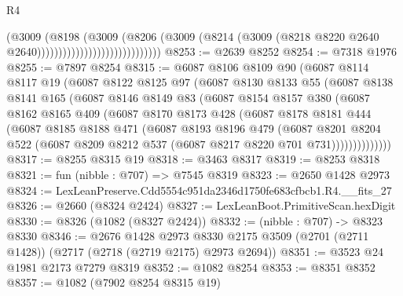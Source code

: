 \begin{lexlean}{R4}
\begin{coremodule}
                                              (@3009
                                                (@8198
                                                  (@3009
                                                    (@8206
                                                      (@3009
                                                        (@8214
                                                          (@3009
                                                            (@8218
                                                              @8220
                                                              @2640
                                                              @2640)))))))))))))))))))))))))))))
@8253 := @2639 @8252
@8254 := @7318 @1976
@8255 := @7897 @8254
@8315 := @6087
    @8106
    @8109
    @90
    (@6087
      @8114
      @8117
      @19
      (@6087
        @8122
        @8125
        @97
        (@6087
          @8130
          @8133
          @55
          (@6087
            @8138
            @8141
            @165
            (@6087
              @8146
              @8149
              @83
              (@6087
                @8154
                @8157
                @380
                (@6087
                  @8162
                  @8165
                  @409
                  (@6087
                    @8170
                    @8173
                    @428
                    (@6087
                      @8178
                      @8181
                      @444
                      (@6087
                        @8185
                        @8188
                        @471
                        (@6087
                          @8193
                          @8196
                          @479
                          (@6087
                            @8201
                            @8204
                            @522
                            (@6087 @8209 @8212 @537 (@6087 @8217 @8220 @701 @731))))))))))))))
@8317 := @8255 @8315 @19
@8318 := @3463 @8317
@8319 := @8253 @8318
@8321 := fun (nibble : @707) => @7545 @8319
@8323 := @2650 @1428 @2973
@8324 := LexLeanPreserve.Cdd5554c951da2346d1750fe683cfbcb1.R4.__fits_27
@8326 := @2660 (@8324 @2424)
@8327 := LexLeanBoot.PrimitiveScan.hexDigit
@8330 := @8326 (@1082 (@8327 @2424))
@8332 := (nibble : @707) -> @8323 @8330
@8346 := @2676
    @1428
    @2973
    @8330
    @2175
    @3509
    (@2701 (@2711 @1428))
    (@2717 (@2718 (@2719 @2175) @2973 @2694))
@8351 := @3523 @24 @1981 @2173 @7279 @8319
@8352 := @1082 @8254
@8353 := @8351 @8352
@8357 := @1082 (@7902 @8254 @8315 @19)

\end{coremodule}
\end{lexlean}
